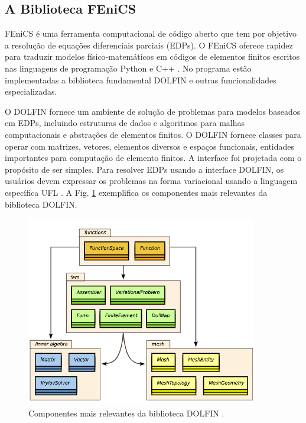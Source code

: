 \subsection{A Biblioteca FEniCS}

FEniCS é uma ferramenta computacional de código aberto que tem por objetivo a resolução de equações diferenciais parciais (EDPs). O FEniCS oferece rapidez para traduzir modelos físico-matemáticos em códigos de elementos finitos escritos nas linguagens de programação Python e C++ \cite{Fenics}. No programa estão implementadas a biblioteca fundamental  DOLFIN e outras funcionalidades especializadas. 

O DOLFIN fornece um ambiente de solução de problemas para modelos baseados em EDPs, incluindo estruturas de dados e algoritmos para malhas computacionais e abstrações de elementos finitos. O DOLFIN fornece classes para operar com matrizes, vetores, elementos diversos e espaços funcionais, entidades importantes para computação de elemento finitos. A interface foi projetada com o propósito de ser simples. Para resolver EDPs usando a interface DOLFIN, os usuários devem expressar os problemas na forma variacional usando a linguagem específica UFL \cite{Logg}. A Fig. \ref{fig:dolfin} exemplifica os componentes mais relevantes da biblioteca DOLFIN.
\begin{figure}[H]
	\centering
	\includegraphics[scale=1]{img/esquema_dolfin.png}
	\caption[Componentes mais relevantes da biblioteca DOLFIN.]{Componentes mais relevantes da biblioteca DOLFIN \cite{Logg}.}
	\label{fig:dolfin}
\end{figure}